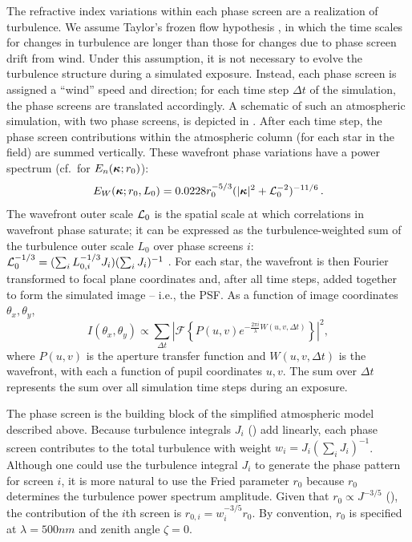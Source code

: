 \documentclass[twocolumn,twocolappendix]{openjournal}
\begin{document}
The refractive index variations within each phase screen are a realization of \vk turbulence.
We assume Taylor's frozen flow hypothesis \citep{taylor_spectrum_1938}, in which the time scales for changes in turbulence are longer than those for changes due to phase screen drift from wind. 
Under this assumption, it is not necessary to evolve the turbulence structure during a simulated exposure. 
Instead, each phase screen is assigned a ``wind'' speed and direction; for each time step $\Delta t$ of the simulation, the phase screens are translated accordingly. 
A schematic of such an atmospheric simulation, with two phase screens, is depicted in .
After each time step, the phase screen contributions within the atmospheric column (for each star in the field) are summed vertically. 
These wavefront phase variations have a \vonkarman power spectrum (cf.\, for $E_n(\boldsymbol{\kappa}; r_0)$): 
\begin{equation}
    E_W(\vect{\kappa};r_0,L_0) = 0.0228r_0^{-5/3}(|\vect{\kappa}|^2+\Lnot^{-2})^{-11/6}\,.
\end{equation}
The wavefront outer scale $\mathcal{L}_0$ is the spatial scale at which correlations in wavefront phase saturate; it can be expressed as the turbulence-weighted sum of the turbulence outer scale $L_0$ over phase screens $i$: $\mathcal{L}_0^{-1/3} = (\sum_i L_{0,i}^{-1/3}J_i)(\sum_iJ_i)^{-1}$ \citep{borgnino_estimation_1990, tokovinin_wavefront_1998}.
For each star, the wavefront is then Fourier transformed to focal plane coordinates and, after all time steps, added together to form the simulated image -- i.e., the PSF.
As a function of image coordinates $\theta_x,\theta_y$, 
\begin{equation}
    I(\theta_x,\theta_y) \propto \sum_{\Delta t} \left| \mathcal{F} \left\{ P(u,v) e^{-\frac{2\pi i}{\lambda}W(u,v, \Delta t)} \right\} \right|^2,
\end{equation}
where $P(u,v)$ is the aperture transfer function and $W(u,v,\Delta t)$ is the wavefront, with each a function of pupil coordinates $u,v$.
The sum over $\Delta t$ represents the sum over all simulation time steps during an exposure.

The phase screen is the building block of the simplified atmospheric model described above. 
Because turbulence integrals $J_i$ () add linearly, each phase screen contributes to the total turbulence with weight $w_i = J_i(\sum_i J_i)^{-1}$.
Although one could use the turbulence integral $J_i$ to generate the phase pattern for screen $i$, it is more natural to use the Fried parameter $r_0$ because $r_0$ determines the turbulence power spectrum amplitude.
Given that $r_0 \propto J^{-3/5}$ (),
the contribution of the $i$th screen is
$r_{0,i} =  w_i^{-3/5} r_0$.
By convention, $r_0$ is specified at $\lambda=500\unit{nm}$ and zenith angle $\zeta=0$. 
\end{document}
